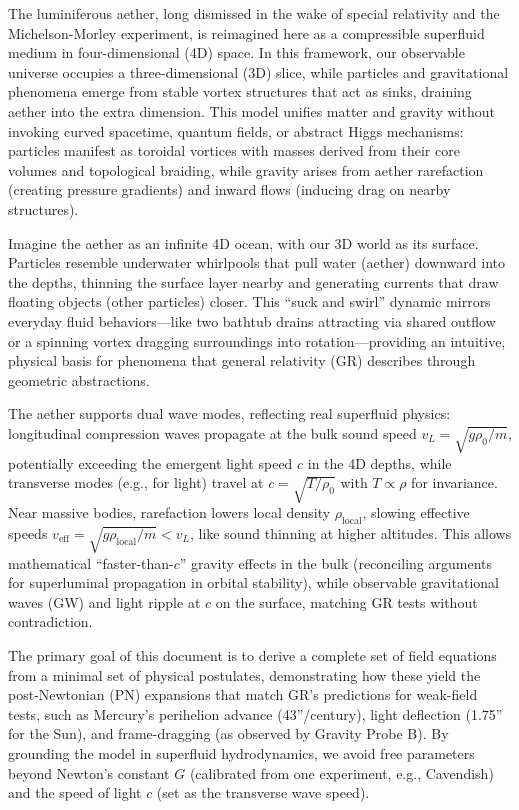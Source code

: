 \documentclass{article}
\begin{document}
The luminiferous aether, long dismissed in the wake of special relativity and the Michelson-Morley experiment, is reimagined here as a compressible superfluid medium in four-dimensional (4D) space. In this framework, our observable universe occupies a three-dimensional (3D) slice, while particles and gravitational phenomena emerge from stable vortex structures that act as sinks, draining aether into the extra dimension. This model unifies matter and gravity without invoking curved spacetime, quantum fields, or abstract Higgs mechanisms: particles manifest as toroidal vortices with masses derived from their core volumes and topological braiding, while gravity arises from aether rarefaction (creating pressure gradients) and inward flows (inducing drag on nearby structures).

Imagine the aether as an infinite 4D ocean, with our 3D world as its surface. Particles resemble underwater whirlpools that pull water (aether) downward into the depths, thinning the surface layer nearby and generating currents that draw floating objects (other particles) closer. This ``suck and swirl'' dynamic mirrors everyday fluid behaviors---like two bathtub drains attracting via shared outflow or a spinning vortex dragging surroundings into rotation---providing an intuitive, physical basis for phenomena that general relativity (GR) describes through geometric abstractions.

The aether supports dual wave modes, reflecting real superfluid physics: longitudinal compression waves propagate at the bulk sound speed $v_L = \sqrt{g \rho_0 / m}$, potentially exceeding the emergent light speed $c$ in the 4D depths, while transverse modes (e.g., for light) travel at $c = \sqrt{T / \rho_0}$ with $T \propto \rho$ for invariance. Near massive bodies, rarefaction lowers local density $\rho_{\text{local}}$, slowing effective speeds $v_{\text{eff}} = \sqrt{g \rho_{\text{local}} / m} < v_L$, like sound thinning at higher altitudes. This allows mathematical ``faster-than-$c$'' gravity effects in the bulk (reconciling arguments for superluminal propagation in orbital stability), while observable gravitational waves (GW) and light ripple at $c$ on the surface, matching GR tests without contradiction.

The primary goal of this document is to derive a complete set of field equations from a minimal set of physical postulates, demonstrating how these yield the post-Newtonian (PN) expansions that match GR's predictions for weak-field tests, such as Mercury's perihelion advance (43''/century), light deflection (1.75'' for the Sun), and frame-dragging (as observed by Gravity Probe B). By grounding the model in superfluid hydrodynamics, we avoid free parameters beyond Newton's constant $G$ (calibrated from one experiment, e.g., Cavendish) and the speed of light $c$ (set as the transverse wave speed).
\end{document}
